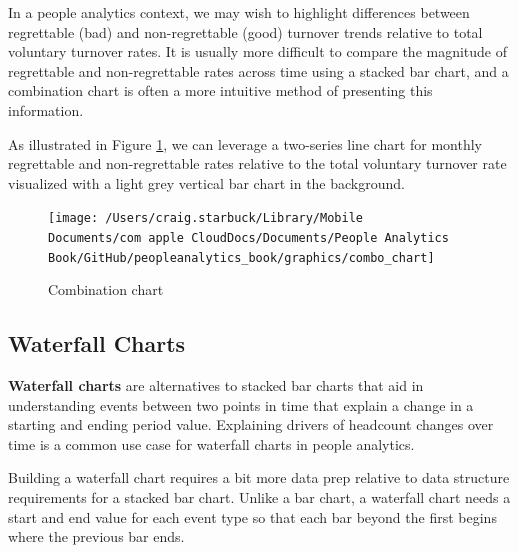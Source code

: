 \documentclass[
]{book}
\begin{document}
In a people analytics context, we may wish to highlight differences between regrettable (bad) and non-regrettable (good) turnover trends relative to total voluntary turnover rates. It is usually more difficult to compare the magnitude of regrettable and non-regrettable rates across time using a stacked bar chart, and a combination chart is often a more intuitive method of presenting this information.

As illustrated in Figure \ref{fig:combo-chart}, we can leverage a two-series line chart for monthly regrettable and non-regrettable rates relative to the total voluntary turnover rate visualized with a light grey vertical bar chart in the background.

\begin{figure}

{\centering \texttt{[image: /Users/craig.starbuck/Library/Mobile Documents/com~apple~CloudDocs/Documents/People Analytics Book/GitHub/peopleanalytics\_book/graphics/combo\_chart]} 

}

\caption{Combination chart}\label{fig:combo-chart}
\end{figure}

\hypertarget{waterfall-charts}{%
\subsection{Waterfall Charts}\label{waterfall-charts}}

\textbf{Waterfall charts} are alternatives to stacked bar charts that aid in understanding events between two points in time that explain a change in a starting and ending period value. Explaining drivers of headcount changes over time is a common use case for waterfall charts in people analytics.

Building a waterfall chart requires a bit more data prep relative to data structure requirements for a stacked bar chart. Unlike a bar chart, a waterfall chart needs a start and end value for each event type so that each bar beyond the first begins where the previous bar ends.
\end{document}
